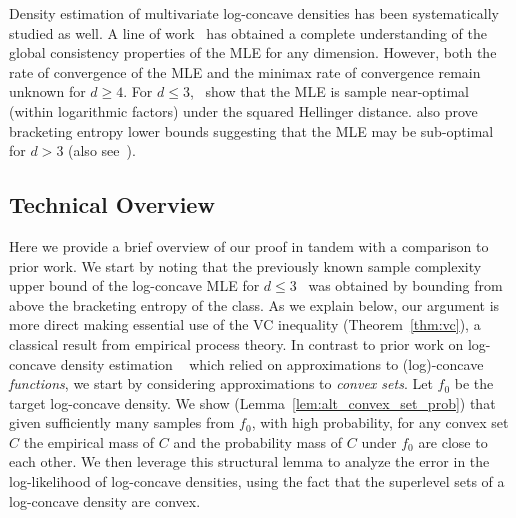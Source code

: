 \documentclass[final,12pt]{colt2018}
\newcommand{\inote}[1]{\footnote{{\bf [[Ilias: {#1}\bf ]] }}}
\newcommand{\new}[1]{{\color{red} #1}}
\newcommand{\new}[1]{{#1}}
\newtheorem{informal theorem}[theorem]{Theorem (informal statement)}
\begin{document}
Density estimation of multivariate log-concave densities has been systematically studied as well.
A line of work~\cite{Cule10a, DumbgenRufibach:09, DossW16, ChenSam13, BalDoss14} has obtained
a complete understanding of the global consistency properties of the MLE for any dimension.
However, both the rate of convergence of the MLE and the minimax rate of convergence remain unknown for $d \geq 4$.
For $d \leq 3$,~\cite{KimSam16} show that the MLE is sample near-optimal (within logarithmic factors) 
under the squared Hellinger distance. \cite{KimSam16} also prove bracketing entropy lower bounds 
suggesting that the MLE may be sub-optimal for $d > 3$ (also see~\cite{Wellner15}).





\subsection{Technical Overview}
Here we provide a brief overview of our proof in tandem with a comparison to prior work.
\new{We start by noting that the previously known sample complexity upper bound of the log-concave 
MLE for $d \leq 3$~\cite{KimSam16}  was obtained by 
bounding from above the bracketing entropy of the class. As we explain below, our argument
is more direct making essential use of the VC inequality (Theorem~\ref{thm:vc}), 
a classical result from empirical process theory.} 
In contrast to prior work on log-concave density estimation
~\cite{KimSam16, DiakonikolasKS17-lc} which relied on approximations to (log)-concave
{\em functions}, we start by considering approximations to {\em convex sets}. 
Let $f_0$ be the target log-concave density. 
We show (Lemma~\ref{lem:alt_convex_set_prob}) that given sufficiently many samples from $f_0$, 
with high probability, for any convex set $C$ the empirical mass of $C$ 
and the probability mass of $C$ under $f_0$ are close to each other. 
We then leverage this structural lemma to analyze the error in the log-likelihood 
of log-concave densities, using the fact that the superlevel 
sets of a log-concave density are convex.
\end{document}
